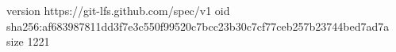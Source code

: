 version https://git-lfs.github.com/spec/v1
oid sha256:af683987811dd3f7e3c550f99520c7bcc23b30c7cf77ceb257b23744bed7ad7a
size 1221
